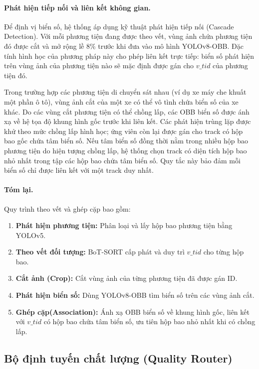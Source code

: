 \documentclass[../DoAn.tex]{subfiles}
\begin{document}
\paragraph{Phát hiện tiếp nối và liên kết không gian.}
Để định vị biển số, hệ thống áp dụng kỹ thuật phát hiện tiếp nối (Cascade Detection). Với mỗi phương tiện đang được theo vết, vùng ảnh chứa phương tiện đó được cắt và mở rộng lề 8\% trước khi đưa vào mô hình YOLOv8-OBB. Đặc tính hình học của phương pháp này cho phép liên kết trực tiếp: biển số phát hiện trên vùng ảnh của phương tiện nào sẽ mặc định được gán cho $v\_tid$ của phương tiện đó.

Trong trường hợp các phương tiện di chuyển sát nhau (ví dụ xe máy che khuất một phần ô tô), vùng ảnh cắt của một xe có thể vô tình chứa biển số của xe khác. Do các vùng cắt phương tiện có thể chồng lấp, các OBB biển số được ánh xạ về hệ tọa độ khung hình gốc trước khi liên kết. Các phát hiện trùng lặp được khử theo mức chồng lấp hình học; ứng viên còn lại được gán cho track có hộp bao gốc chứa tâm biển số. Nếu tâm biển số đồng thời nằm trong nhiều hộp bao phương tiện do hiện tượng chồng lấp, hệ thống chọn track có diện tích hộp bao nhỏ nhất trong tập các hộp bao chứa tâm biển số. Quy tắc này bảo đảm mỗi biển số chỉ được liên kết với một track duy nhất.

\paragraph{Tóm lại.}
Quy trình theo vết và ghép cặp bao gồm:
\begin{enumerate}
\item \textbf{Phát hiện phương tiện:} Phân loại và lấy hộp bao phương tiện bằng YOLOv5.
\item \textbf{Theo vết đối tượng:} BoT-SORT cấp phát và duy trì $v\_tid$ cho từng hộp bao.
\item \textbf{Cắt ảnh (Crop):} Cắt vùng ảnh của từng phương tiện đã được gán ID.
\item \textbf{Phát hiện biển số:} Dùng YOLOv8-OBB tìm biển số trên các vùng ảnh cắt.
\item \textbf{Ghép cặp(Association):} Ánh xạ OBB biển số về khung hình gốc, liên kết với $v\_tid$ có hộp bao chứa tâm biển số, ưu tiên hộp bao nhỏ nhất khi có chồng lấp.
\end{enumerate}

\subsection{Bộ định tuyến chất lượng (Quality Router)}
\label{subsection:3.3.quality}
\end{document}
